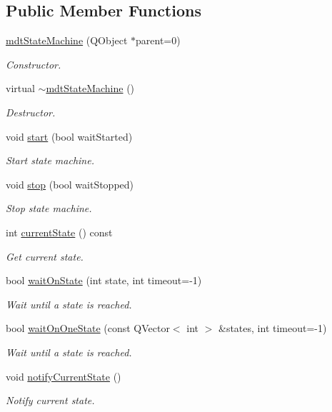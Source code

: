\subsection*{Public Member Functions}
\begin{DoxyCompactItemize}
\item 
\hyperlink{classmdt_state_machine_af2b15b9b0bbf48c6adb75a69dd255718}{mdt\-State\-Machine} (Q\-Object $\ast$parent=0)
\begin{DoxyCompactList}\small\item\em Constructor. \end{DoxyCompactList}\item 
virtual \hyperlink{classmdt_state_machine_ac32776aa0587ec290576e6e2cafb631f}{$\sim$mdt\-State\-Machine} ()
\begin{DoxyCompactList}\small\item\em Destructor. \end{DoxyCompactList}\item 
void \hyperlink{classmdt_state_machine_a1dcc7d12c50500cdbda8b7ef1e141901}{start} (bool wait\-Started)
\begin{DoxyCompactList}\small\item\em Start state machine. \end{DoxyCompactList}\item 
void \hyperlink{classmdt_state_machine_a1a4d6288c13cc1ed334de850836132a8}{stop} (bool wait\-Stopped)
\begin{DoxyCompactList}\small\item\em Stop state machine. \end{DoxyCompactList}\item 
int \hyperlink{classmdt_state_machine_a16a99b2d6d077e1ea39622ef0e2b5a5b}{current\-State} () const 
\begin{DoxyCompactList}\small\item\em Get current state. \end{DoxyCompactList}\item 
bool \hyperlink{classmdt_state_machine_ab14dc03757e493d35d510af8a1b436b6}{wait\-On\-State} (int state, int timeout=-\/1)
\begin{DoxyCompactList}\small\item\em Wait until a state is reached. \end{DoxyCompactList}\item 
bool \hyperlink{classmdt_state_machine_a12e8c253a5ca6e92e9f1c92f1546e4b8}{wait\-On\-One\-State} (const Q\-Vector$<$ int $>$ \&states, int timeout=-\/1)
\begin{DoxyCompactList}\small\item\em Wait until a state is reached. \end{DoxyCompactList}\item 
void \hyperlink{classmdt_state_machine_a6fa653fc7e2ea8a58e2d160ba6d96013}{notify\-Current\-State} ()
\begin{DoxyCompactList}\small\item\em Notify current state. \end{DoxyCompactList}\end{DoxyCompactItemize}


